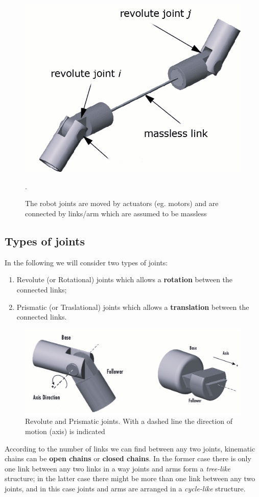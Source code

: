 \begin{figure}
    \centering
    \includegraphics[scale=0.5]{img/joints_links.png}
    \caption{The robot joints are moved by actuators (eg. motors) and are connected by links/arm which are assumed to be massless}.
\end{figure}

\subsection{Types of joints}
In the following we will consider two types of joints: 
\begin{enumerate}
    \itemsep-0.3em
    \item \textsf{Revolute (or Rotational) joints} which allows a \textbf{rotation} between the connected links; 
    \item \textsf{Prismatic (or Traslational) joints} which allows a \textbf{translation} between the connected links.
\end{enumerate}

\begin{figure}
    \centering
    \includegraphics[scale=0.5]{img/joints_tyeps.png}
    \caption{Revolute and Prismatic joints. With a dashed line the direction of motion (axis) is indicated}
\end{figure}
According to the number of links we can find between any two joints, kinematic chains can be \textbf{open chains} or \textbf{closed chains}. In the former case there is only one link between any two links in a way joints and arms form a \textit{tree-like} structure; in the latter case there might be more than one link between any two joints, and in this case joints and arms are arranged in a \textit{cycle-like} structure.

